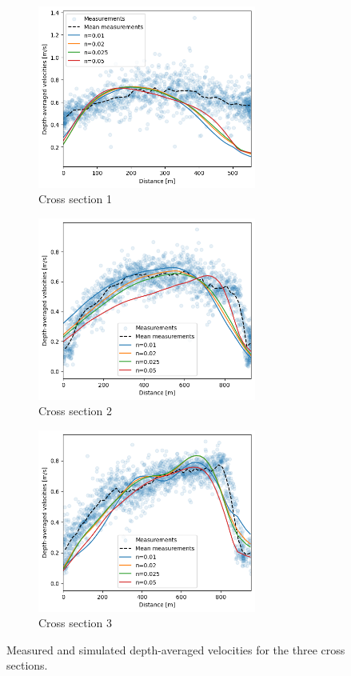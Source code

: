 \begin{figure}[H]
    \centering
    \begin{subfigure}[t]{0.48\linewidth}
        \centering
        \includegraphics[width=\linewidth, height=6cm, keepaspectratio]{figures/ch7/dav_cal_1.png}
        \caption{Cross section 1}
        \label{fig: dav cal cs1}
    \end{subfigure}
    \hfill
    \begin{subfigure}[t]{0.48\linewidth}
        \centering
        \includegraphics[width=\linewidth, height=6cm, keepaspectratio]{figures/ch7/dav_cal_2.png}
        \caption{Cross section 2}
        \label{fig: dav cal cs1}
    \end{subfigure}
    \vspace{1em}
    \begin{subfigure}[t]{0.48\linewidth}
        \centering
        \includegraphics[width=\linewidth, height=6cm, keepaspectratio]{figures/ch7/dav_cal_3.png}
        \caption{Cross section 3}
        \label{fig: dav cal cs1}
    \end{subfigure}
    \caption{Measured and simulated depth-averaged velocities for the three cross sections.}
    \label{fig: Depth-averaged velocity calibration}
\end{figure}

